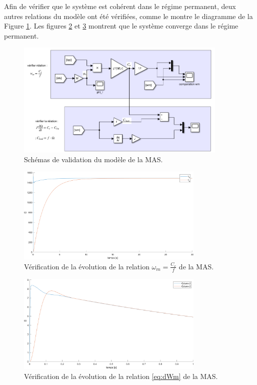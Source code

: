 Afin de vérifier que le système est cohérent dans le régime permanent, deux autres relations du modèle ont été vérifiées, comme le montre le diagramme de la Figure \ref{img-CI_verifier_relations}. Les figures \ref{img-simuMatlab-comparation_wm} et \ref{img-simuMatlab-relation} montrent que le système converge dans le régime permanent. 

\begin{figure}[!h]
    \centering
    \includegraphics[width=0.9\textwidth]{imgsMATLAB/MAS/CI/CI_verifier_relations.png} 
    \caption{Schémas de validation du modèle de la MAS.}
    \label{img-CI_verifier_relations}
\end{figure}



\begin{figure}[!h]
    \centering
    \includegraphics[width=0.8\textwidth]{simusMATLAB/MAS/comparation_wm.png} 
    \caption{Vérification de la évolution de la relation $\omega_m = \frac{C_e}{f}$ de la MAS.}
    \label{img-simuMatlab-comparation_wm}
\end{figure}


\begin{figure}[!h]
    \centering
    \includegraphics[width=0.8\textwidth]{simusMATLAB/MAS/relation.png} 
    \caption{Vérification de la évolution de la relation \ref{eq:dWm} de la MAS.}
    \label{img-simuMatlab-relation}
\end{figure}


